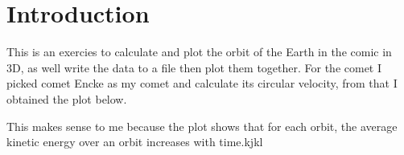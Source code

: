 \documentclass{article}
\begin{document}
\section{Introduction}
This is an exercies to calculate and plot the orbit of the Earth in the comic in 3D, as well write the data to a file then plot them together.
For the comet I picked comet Encke as my comet and calculate its circular velocity, from that I obtained the plot below.
\begin{figure}[H]
\end{figure}

This makes sense to me because the plot shows that for each orbit, the average kinetic energy over an orbit increases with time.kjkl
\end{document}
